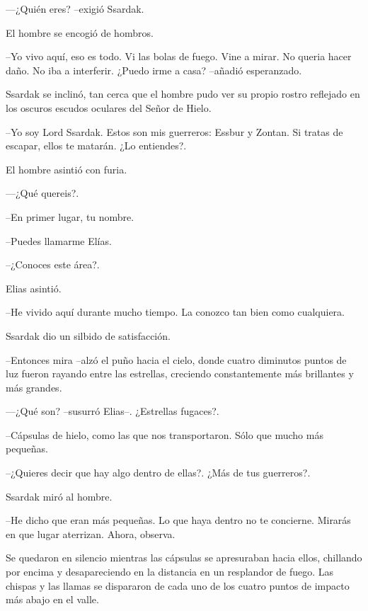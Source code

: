 —¿Quién eres? --exigió Ssardak.



El hombre se encogió de hombros. 


--Yo vivo aquí, eso es todo. Vi las bolas de fuego. Vine a mirar. No queria hacer daño. No iba a interferir. ¿Puedo irme a casa? --añadió esperanzado.



Ssardak se inclinó, tan cerca que el hombre pudo ver su propio rostro reflejado en los oscuros escudos oculares del Señor de Hielo.


--Yo soy Lord Ssardak. Estos son mis guerreros: Essbur y Zontan. Si tratas de escapar, ellos te matarán. ¿Lo entiendes?.



El hombre asintió con furia. 


—¿Qué quereis?.


--En primer lugar, tu nombre.



--Puedes llamarme Elías. 



--¿Conoces este área?.



Elias asintió. 


--He vivido aquí durante mucho tiempo. La conozco tan bien como cualquiera.



Ssardak dio un silbido de satisfacción. 


--Entonces mira --alzó el puño hacia el cielo, donde cuatro diminutos puntos de luz fueron rayando entre las estrellas, creciendo constantemente más brillantes y más grandes.



—¿Qué son? --susurró Elias--. ¿Estrellas fugaces?.



--Cápsulas de hielo, como las que nos transportaron. Sólo que mucho más pequeñas. 



--¿Quieres decir que hay algo dentro de ellas?. ¿Más de tus guerreros?.



Ssardak miró al hombre. 


--He dicho que eran más pequeñas. Lo que haya dentro no te concierne. Mirarás en que lugar aterrizan. Ahora, observa.



Se quedaron en silencio mientras las cápsulas se apresuraban hacia ellos, chillando por encima y desapareciendo en la distancia en un resplandor de fuego. Las chispas y las llamas se dispararon de cada uno de los cuatro puntos de impacto más abajo en el valle.



